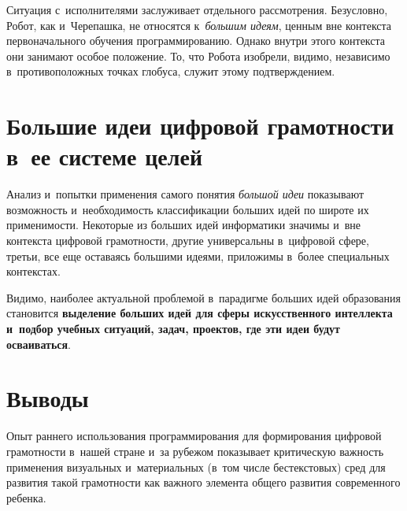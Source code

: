 \begin{multicols}{2}
  Ситуация с~исполнителями заслуживает отдельного рассмотрения. 
Безусловно, Робот, как и~Черепашка, не относятся к~\textit{большим идеям}, 
ценным вне контекста первоначального обучения программированию. Однако 
внутри этого контекста они занимают особое положение. То, что Робота 
изобрели, видимо, независимо в~противоположных точках глобуса, служит 
этому подтверждением. 

\section{Большие идеи цифровой грамотности в~ее системе 
целей}
  
  Анализ и~попытки применения самого понятия \textit{большой идеи} 
показывают возможность и~необходимость классификации больших идей по 
широте их применимости. Некоторые из больших идей информатики значимы 
и~вне контекста цифровой грамотности, другие универсальны в~цифровой 
сфере, третьи, все еще оставаясь большими идеями, приложимы в~более 
специальных контекстах. 
  
  Видимо, наиболее актуальной проблемой в~парадигме больших идей 
образования  становится \textbf{выделение больших идей для сферы 
искусственного интеллекта и~подбор учебных ситуаций, задач, 
проектов, где эти идеи будут осваиваться}.
   
\vspace*{-6pt}

\section{Выводы}
\vspace*{-2pt}

  Опыт раннего использования программирования для формирования 
цифровой грамотности в~нашей стране и~за рубежом показывает критическую 
важ\-ность применения визуальных и~материальных (в~том чис\-ле 
бестекстовых) сред для развития такой гра\-мот\-ности как важного элемента 
общего развития современного ребенка.

\vspace*{-6pt}

{\small\frenchspacing
 {%
 \begin{thebibliography}{99}

\vspace*{-2pt}


\end{thebibliography}}}
\end{multicols}
